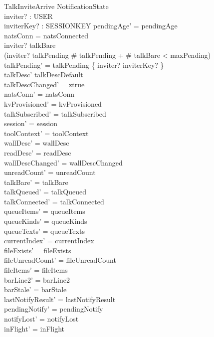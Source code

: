 \documentclass[a4paper,10pt,fleqn]{article}
\begin{document}
\begin{schema}{TalkInviteArrive}
  \Delta NotificationState \\
  inviter? : USER \\
  inviterKey? : SESSIONKEY
  \where
  pendingAge' = pendingAge \\
  natsConn = natsConnected \\
  inviter? \notin talkBare \\
  (inviter? \in \dom talkPending \lor
  \# talkPending + \# talkBare < maxPending) \\
  talkPending' = talkPending \oplus \{ inviter? \mapsto inviterKey? \} \\
  talkDesc' \neq talkDescDefault \\
  talkDescChanged' = ztrue \\
  natsConn' = natsConn \\
  kvProvisioned' = kvProvisioned \\
  talkSubscribed' = talkSubscribed \\
  session' = session \\
  toolContext' = toolContext \\
  wallDesc' = wallDesc \\
  readDesc' = readDesc \\
  wallDescChanged' = wallDescChanged \\
  unreadCount' = unreadCount \\
  talkBare' = talkBare \\
  talkQueued' = talkQueued \\
  talkConnected' = talkConnected \\
  queueItems' = queueItems \\
  queueKinds' = queueKinds \\
  queueTexts' = queueTexts \\
  currentIndex' = currentIndex \\
  fileExists' = fileExists \\
  fileUnreadCount' = fileUnreadCount \\
  fileItems' = fileItems \\
  barLine2' = barLine2 \\
  barStale' = barStale \\
  lastNotifyResult' = lastNotifyResult \\
  pendingNotify' = pendingNotify \\
  notifyLost' = notifyLost \\
  inFlight' = inFlight \\

\end{schema}
\end{document}
